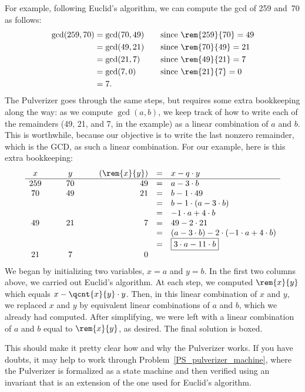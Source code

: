 For example, following Euclid's algorithm, we can compute the gcd of
259 and~70 as follows:
\begin{align*}
\gcd(259, 70) & = \gcd(70, 49) & \quad & \text{since $\rem{259}{70} = 49$}\\
 & = \gcd(49, 21) && \text{since $\rem{70}{49} = 21$} \\
 & = \gcd(21, 7) && \text{since $\rem{49}{21} = 7$} \\
 & = \gcd(7, 0)
                && \text{since $\rem{21}{7} = 0$} \\
 & = 7.
\end{align*}
The Pulverizer goes through the same steps, but requires some extra
bookkeeping along the way: as we compute $\gcd(a, b)$, we keep track
of how to write each of the remainders (49, 21, and 7, in the example)
as a linear combination of $a$ and $b$.  This is worthwhile, because
our objective is to write the last nonzero remainder, which is the
GCD, as such a linear combination.  For our example, here is this
extra bookkeeping:
\[
\begin{array}{ccccrcl}
x & \quad & y & \quad & (\rem{x}{y}) & = & x - q \cdot y \\
\hline
259 && 70 && 49 & = & a - 3 \cdot  b\\
 70 && 49 && 21 & = & b - 1 \cdot 49 \\
           &&&& & = & b - 1 \cdot (a - 3 \cdot b) \\
           &&&& & = & -1 \cdot a + 4 \cdot b \\
 49 && 21 && 7  & = & 49 - 2 \cdot 21\\
           &&&& & = & (a - 3 \cdot b) - 2 \cdot (-1 \cdot a + 4 \cdot b) \\
           &&&& & = & \fbox{$3 \cdot a - 11 \cdot b$} \\
 21 && 7 && 0
\end{array}
\]
We began by initializing two variables, $x = a$ and $y = b$.  In the
first two columns above, we carried out Euclid's algorithm.  At each
step, we computed $\rem{x}{y}$ which equals $x - \qcnt{x}{y} \cdot y$.
Then, in this linear combination of $x$ and $y$, we replaced $x$ and
$y$ by equivalent linear combinations of $a$ and $b$, which we already
had computed.  After simplifying, we were left with a linear
combination of $a$ and $b$ equal to $\rem{x}{y}$, as desired.  The
final solution is boxed.

This should make it pretty clear how and why the Pulverizer works.  If
you have doubts, it may help to work through
Problem~\ref{PS_pulverizer_machine}, where the Pulverizer is
formalized as a state machine and then verified using an invariant
that is an extension of the one used for Euclid's algorithm.

